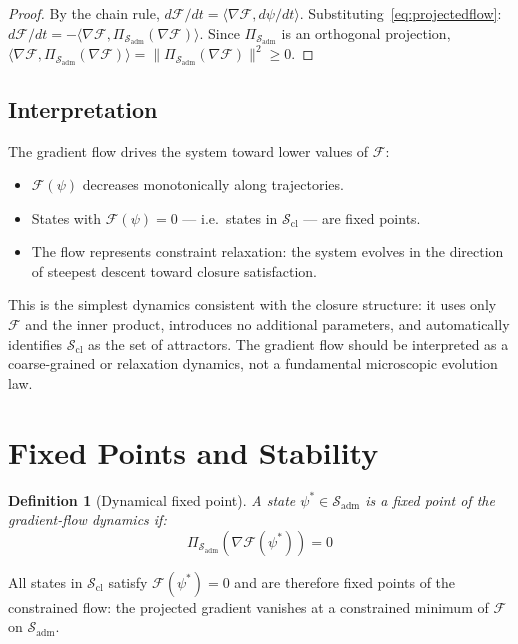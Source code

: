 \documentclass[12pt]{article}
\newtheorem{definition}[theorem]{Definition}
\newcommand{\Fcal}{\mathcal{F}}
\newcommand{\Sadm}{\mathcal{S}_{\mathrm{adm}}}
\newcommand{\Scl}{\mathcal{S}_{\mathrm{cl}}}
\begin{document}
\begin{proof}
By the chain rule, $d\Fcal/dt = \langle\nabla\Fcal, d\psi/dt\rangle$. Substituting~\eqref{eq:projectedflow}: $d\Fcal/dt = -\langle\nabla\Fcal, \Pi_{\Sadm}(\nabla\Fcal)\rangle$. Since $\Pi_{\Sadm}$ is an orthogonal projection, $\langle\nabla\Fcal, \Pi_{\Sadm}(\nabla\Fcal)\rangle = \|\Pi_{\Sadm}(\nabla\Fcal)\|^2 \geq 0$.
\end{proof}

\subsection{Interpretation}

The gradient flow drives the system toward lower values of $\Fcal$:
\begin{itemize}
    \item $\Fcal(\psi)$ decreases monotonically along trajectories.
    \item States with $\Fcal(\psi) = 0$ --- i.e.\ states in $\Scl$ --- are fixed points.
    \item The flow represents constraint relaxation: the system evolves in the direction of steepest descent toward closure satisfaction.
\end{itemize}

This is the simplest dynamics consistent with the closure structure: it uses only $\Fcal$ and the inner product, introduces no additional parameters, and automatically identifies $\Scl$ as the set of attractors. The gradient flow should be interpreted as a coarse-grained or relaxation dynamics, not a fundamental microscopic evolution law.

\section{Fixed Points and Stability}\label{sec:fixedpoints}

\begin{definition}[Dynamical fixed point]\label{def:fixedpoint}
A state $\psi^* \in \Sadm$ is a fixed point of the gradient-flow dynamics if:
\begin{equation}
    \Pi_{\Sadm}\!\left(\nabla\Fcal(\psi^*)\right) = 0
\end{equation}
\end{definition}

All states in $\Scl$ satisfy $\Fcal(\psi^*) = 0$ and are therefore fixed points of the constrained flow: the projected gradient vanishes at a constrained minimum of $\Fcal$ on $\Sadm$.
\end{document}
